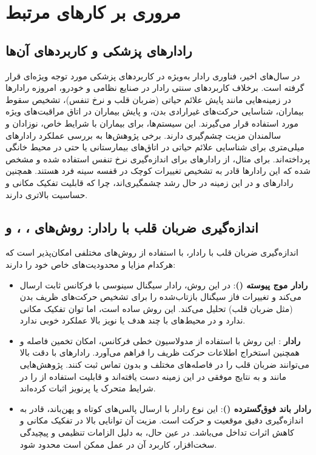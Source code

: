 \section{مروری بر کارهای مرتبط} %
\label{sec:related-work}

\subsection{رادارهای پزشکی و کاربردهای آن‌ها} %
\label{sec:medical-radars}

در سال‌های اخیر، فناوری رادار به‌ویژه در کاربردهای پزشکی مورد توجه ویژه‌ای قرار گرفته است.\cite{li2013review} برخلاف کاربردهای سنتی رادار در صنایع نظامی و خودرو، امروزه رادارها در زمینه‌هایی مانند پایش علائم حیاتی (ضربان قلب و نرخ تنفس)، تشخیص سقوط بیماران، شناسایی حرکت‌های غیرارادی بدن، و پایش بیماران در اتاق مراقبت‌های ویژه مورد استفاده قرار می‌گیرند. این سیستم‌ها، برای بیماران با شرایط خاص، نوزادان و سالمندان مزیت چشم‌گیری دارند.
برخی پژوهش‌ها به بررسی عملکرد رادارهای میلی‌متری برای شناسایی علائم حیاتی در اتاق‌های بیمارستانی یا حتی در محیط خانگی پرداخته‌اند. برای مثال، از رادارهای  برای اندازه‌گیری نرخ تنفس استفاده شده و مشخص شده که این رادارها قادر به تشخیص تغییرات کوچک در قفسه سینه فرد هستند. همچنین رادارهای  و  در این زمینه در حال رشد چشمگیری‌اند، چرا که قابلیت تفکیک مکانی و حساسیت بالاتری دارند.

\subsection{اندازه‌گیری ضربان قلب با رادار: روش‌های ، ، و } %
\label{sec:heart-rate-radar-methods}

اندازه‌گیری ضربان قلب با رادار، با استفاده از روش‌های مختلفی امکان‌پذیر است که هرکدام مزایا و محدودیت‌های خاص خود را دارند:
\begin{itemize}
    \item \textbf{رادار موج پیوسته ()}: در این روش، رادار سیگنال سینوسی با فرکانس ثابت ارسال می‌کند و تغییرات فاز سیگنال بازتاب‌شده را برای تشخیص حرکت‌های ظریف بدن (مثل ضربان قلب) تحلیل می‌کند. این روش ساده است، اما توان تفکیک مکانی ندارد و در محیط‌های با چند هدف یا نویز بالا عملکرد خوبی ندارد.
    \item \textbf{رادار }: این روش با استفاده از مدولاسیون خطی فرکانس، امکان تخمین فاصله و همچنین استخراج اطلاعات حرکت ظریف را فراهم می‌آورد. رادارهای  با دقت بالا می‌توانند ضربان قلب را در فاصله‌های مختلف و بدون تماس ثبت کنند. پژوهش‌هایی مانند  و  به نتایج موفقی در این زمینه دست یافته‌اند و قابلیت استفاده از  را در شرایط متحرک یا پرنویز اثبات کرده‌اند.\cite{yue2020non}
    \item \textbf{رادار باند فوق‌گسترده ()}: این نوع رادار با ارسال پالس‌های کوتاه و پهن‌باند، قادر به اندازه‌گیری دقیق موقعیت و حرکت است. مزیت آن توانایی بالا در تفکیک مکانی و کاهش اثرات تداخل می‌باشد. در عین حال، به دلیل الزامات تنظیمی و پیچیدگی سخت‌افزار، کاربرد آن در عمل ممکن است محدود شود.
\end{itemize}

